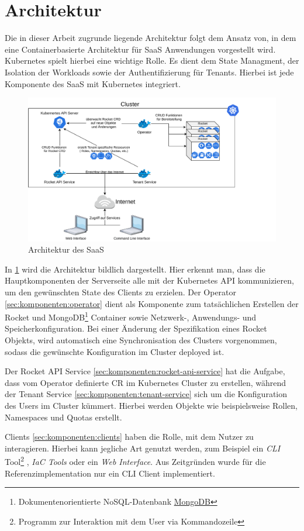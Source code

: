 \section{Architektur}
\label{sec:komponenten:architektur}

Die in dieser Arbeit zugrunde liegende Architektur folgt dem Ansatz von\cite{Truyen2016}, in dem eine Containerbasierte
Architektur für \ac{SaaS} Anwendungen vorgestellt wird. Kubernetes spielt hierbei eine wichtige Rolle. Es dient dem State
Managment, der Isolation der Workloads sowie der Authentifizierung für Tenants. Hierbei ist jede Komponente des \ac{SaaS}
mit Kubernetes integriert.

\begin{figure}[h]
  \includegraphics[width=45em]{gfx/chapters/3_komponenten/saas_architecture.pdf}
  \caption{Architektur des \ac{SaaS}}
  \label{fig:architektur}
\end{figure}

In \ref{fig:architektur} wird die Architektur bildlich dargestellt.
Hier erkennt man, dass die Hauptkomponenten der Serverseite alle mit der Kubernetes API kommunizieren,
um den gewünschten State des Clients zu erzielen. Der Operator \ref{sec:komponenten:operator} dient als Komponente zum tatsächlichen
Erstellen der Rocket und MongoDB\footnote{Dokumentenorientierte NoSQL-Datenbank \href{https://www.mongodb.com/}{MongoDB}}
Container sowie Netzwerk-, Anwendungs- und Speicherkonfiguration.
Bei einer Änderung der Spezifikation eines Rocket Objekts, wird automatisch eine Synchronisation des 
Clusters vorgenommen, sodass die gewünschte Konfiguration im Cluster deployed ist.

Der Rocket API Service \ref{sec:komponenten:rocket-api-service} hat die Aufgabe, 
dass vom Operator definierte \ac{CR} im Kubernetes Cluster zu erstellen, während der 
Tenant Service \ref{sec:komponenten:tenant-service} sich um die Konfiguration des Users im Cluster kümmert.
Hierbei werden Objekte wie beispielsweise Rollen, Namespaces und Quotas erstellt.

Clients \ref{sec:komponenten:clients} haben die Rolle, mit dem Nutzer zu interagieren. Hierbei kann jegliche Art genutzt werden,
zum Beispiel ein \emph{\ac{CLI}} Tool\footnote{Programm zur Interaktion mit dem User via Kommandozeile}
, \emph{\ac{IaC} Tools} oder ein \emph{Web Interface}. Aus Zeitgründen wurde für die Referenzimplementation nur
ein \ac{CLI} Client implementiert.

